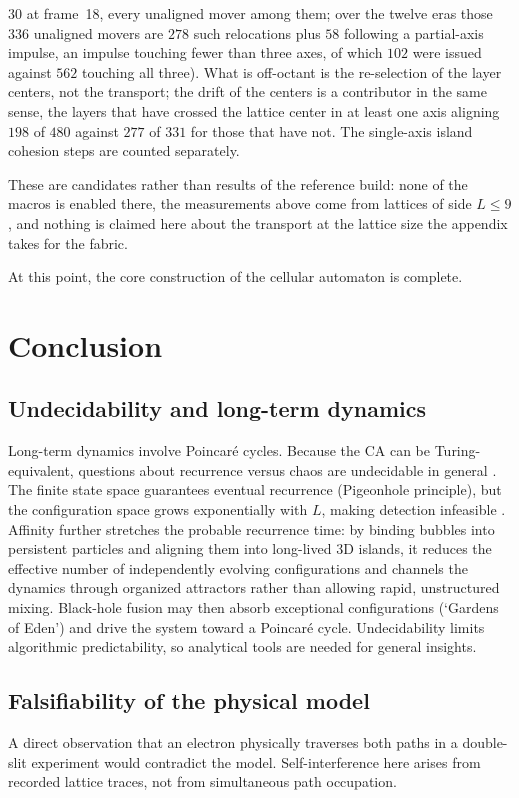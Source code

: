 \documentclass[a4paper]{article}
\begin{document}
\begin{itemize}
$30$ at frame~18, every unaligned mover among them; over the twelve eras those $336$ unaligned movers are $278$ such relocations plus $58$ following a partial-axis impulse, an impulse touching fewer than three axes, of which $102$ were issued against $562$ touching all three).  What is off-octant is the re-selection of the layer centers, not the transport; the drift of the centers is a contributor in the same sense, the layers that have crossed the lattice center in at least one axis aligning $198$ of $480$ against $277$ of $331$ for those that have not.  The single-axis island cohesion steps are counted separately.
\end{itemize}
These are candidates rather than results of the reference build: none of the macros is enabled there, the measurements above come from lattices of side $L\le 9$, and nothing is claimed here about the transport at the lattice size the appendix takes for the fabric.

At this point, the core construction of the cellular automaton is complete.
\section{Conclusion\label{sec:Discussion}}
\subsection{Undecidability and long-term dynamics}\label{sec-undecidability}
Long-term dynamics involve Poincar\'{e} cycles. Because the CA can be Turing-equivalent, questions about recurrence versus chaos are undecidable in general \cite{wolfram1983,gacs1979}. The finite state space guarantees eventual recurrence (Pigeonhole principle), but the configuration space grows exponentially with $L$, making detection infeasible \cite{bernstein2007,toffoli1980}. Affinity further stretches the probable recurrence time: by binding bubbles into persistent particles and aligning them into long-lived 3D islands, it reduces the effective number of independently evolving configurations and channels the dynamics through organized attractors rather than allowing rapid, unstructured mixing. Black-hole fusion may then absorb exceptional configurations (`Gardens of Eden') and drive the system toward a Poincar\'{e} cycle. Undecidability limits algorithmic predictability, so analytical tools are needed for general insights.
\subsection{Falsifiability of the physical model}
A direct observation that an electron physically traverses both paths in a double-slit experiment would contradict the model. Self-interference here arises from recorded lattice traces, not from simultaneous path occupation.
\end{document}
